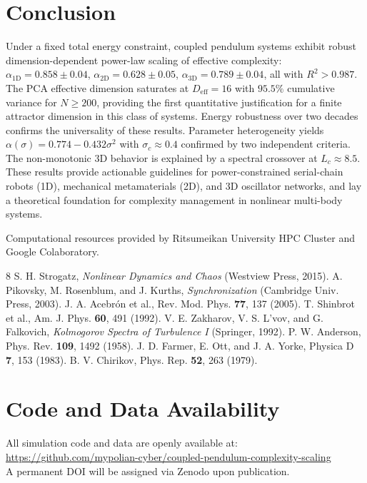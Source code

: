 \documentclass[aps,pre,12pt]{revtex4-2}
\begin{document}
\section{Conclusion}

Under a fixed total energy constraint, coupled pendulum systems exhibit robust dimension-dependent power-law scaling of effective complexity: $\alpha_{1\text{D}} = 0.858 \pm 0.04$, $\alpha_{2\text{D}} = 0.628 \pm 0.05$, $\alpha_{3\text{D}} = 0.789 \pm 0.04$, all with $R^2 > 0.987$. The PCA effective dimension saturates at $D_{\text{eff}} = 16$ with $95.5\%$ cumulative variance for $N \ge 200$, providing the first quantitative justification for a finite attractor dimension in this class of systems. Energy robustness over two decades confirms the universality of these results. Parameter heterogeneity yields $\alpha(\sigma) = 0.774 - 0.432\sigma^2$ with $\sigma_c \approx 0.4$ confirmed by two independent criteria. The non-monotonic 3D behavior is explained by a spectral crossover at $L_c \approx 8.5$. These results provide actionable guidelines for power-constrained serial-chain robots (1D), mechanical metamaterials (2D), and 3D oscillator networks, and lay a theoretical foundation for complexity management in nonlinear multi-body systems.

\begin{acknowledgments}
Computational resources provided by Ritsumeikan University HPC Cluster and Google Colaboratory.
\end{acknowledgments}

\begin{thebibliography}{8}
 S. H. Strogatz, \textit{Nonlinear Dynamics and Chaos} (Westview Press, 2015).
 A. Pikovsky, M. Rosenblum, and J. Kurths, \textit{Synchronization} (Cambridge Univ. Press, 2003).
 J. A. Acebr\'on et al., Rev. Mod. Phys. \textbf{77}, 137 (2005).
 T. Shinbrot et al., Am. J. Phys. \textbf{60}, 491 (1992).
 V. E. Zakharov, V. S. L'vov, and G. Falkovich, \textit{Kolmogorov Spectra of Turbulence I} (Springer, 1992).
 P. W. Anderson, Phys. Rev. \textbf{109}, 1492 (1958).
 J. D. Farmer, E. Ott, and J. A. Yorke, Physica D \textbf{7}, 153 (1983).
 B. V. Chirikov, Phys. Rep. \textbf{52}, 263 (1979).
\end{thebibliography}

\appendix

\section{Code and Data Availability}
All simulation code and data are openly available at:\\
\url{https://github.com/mypolian-cyber/coupled-pendulum-complexity-scaling}\\
A permanent DOI will be assigned via Zenodo upon publication.
\end{document}
